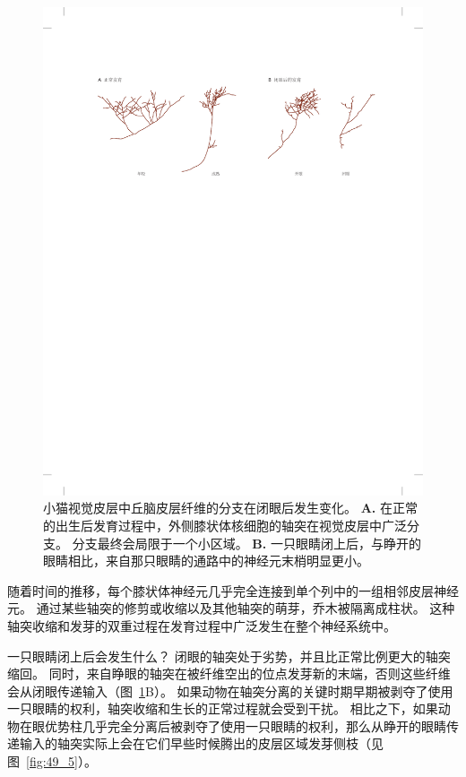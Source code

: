 \begin{figure}[htbp]
	\centering
	\includegraphics[width=1.0\linewidth]{chap49/fig_49_11}
	\caption{小猫视觉皮层中丘脑皮层纤维的分支在闭眼后发生变化\cite{antonini1993rapid}。
		\textbf{A.} 在正常的出生后发育过程中，外侧膝状体核细胞的轴突在视觉皮层中广泛分支。
		分支最终会局限于一个小区域。
		\textbf{B.} 一只眼睛闭上后，与睁开的眼睛相比，来自那只眼睛的通路中的神经元末梢明显更小。}
	\label{fig:49_11}
\end{figure}


随着时间的推移，每个膝状体神经元几乎完全连接到单个列中的一组相邻皮层神经元。
通过某些轴突的修剪或收缩以及其他轴突的萌芽，乔木被隔离成柱状。
这种轴突收缩和发芽的双重过程在发育过程中广泛发生在整个神经系统中。


一只眼睛闭上后会发生什么？
闭眼的轴突处于劣势，并且比正常比例更大的轴突缩回。
同时，来自睁眼的轴突在被纤维空出的位点发芽新的末端，否则这些纤维会从闭眼传递输入（图~\ref{fig:49_11}B）。
如果动物在轴突分离的关键时期早期被剥夺了使用一只眼睛的权利，轴突收缩和生长的正常过程就会受到干扰。
相比之下，如果动物在眼优势柱几乎完全分离后被剥夺了使用一只眼睛的权利，那么从睁开的眼睛传递输入的轴突实际上会在它们早些时候腾出的皮层区域发芽侧枝（见图~\ref{fig:49_5}）。


